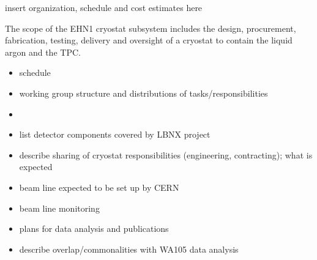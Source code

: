 insert organization, schedule and cost estimates here

The scope of the EHN1 cryostat subsystem includes the design, procurement, fabrication, testing, delivery and oversight of a cryostat to contain the liquid argon and the TPC.

\begin{itemize}
\item schedule

\item working group structure and distributions of tasks/responsibilities
\item

\item list detector components covered by LBNX project
\item describe sharing of cryostat responsibilities (engineering, contracting); what is expected 
\item beam line expected to be set up by CERN
\item beam line monitoring


\item plans for data analysis and publications
\item describe overlap/commonalities with WA105 data analysis


\end{itemize}